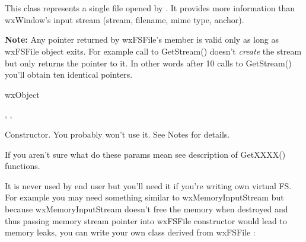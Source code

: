 %
%

\section{}\label{wxfsfile}

This class represents a single file opened by .
It provides more information than wxWindow's input stream 
(stream, filename, mime type, anchor).

{\bf Note:} Any pointer returned by wxFSFile's member is valid
only as long as wxFSFile object exits. For example call to GetStream()
doesn't {\it create} the stream but only returns the pointer to it. In
other words after 10 calls to GetStream() you'll obtain ten identical
pointers.


wxObject


, 
,


\label{wxfsfilewxfsfile}


Constructor. You probably won't use it. See Notes for details.






If you aren't sure what do these params mean see description of GetXXXX()
functions.


It is never used by end user but you'll need it if
you're writing own virtual FS. For example you may need something
similar to wxMemoryInputStream but because wxMemoryInputStream
doesn't free the memory when destroyed and thus passing memory stream
pointer into wxFSFile constructor would lead to memory leaks, you
can write your own class derived from wxFSFile :

